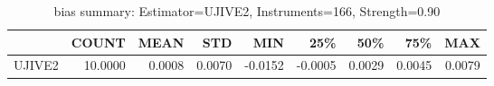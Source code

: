 \begin{table}[ht]
\centering
\caption{bias summary: Estimator=UJIVE2, Instruments=166, Strength=0.90}
\begin{tabular}{lrrrrrrrr}
\toprule
 & COUNT & MEAN & STD & MIN & 25\% & 50\% & 75\% & MAX \\
\midrule
UJIVE2 & 10.0000 & 0.0008 & 0.0070 & -0.0152 & -0.0005 & 0.0029 & 0.0045 & 0.0079 \\
\bottomrule
\end{tabular}
\end{table}
